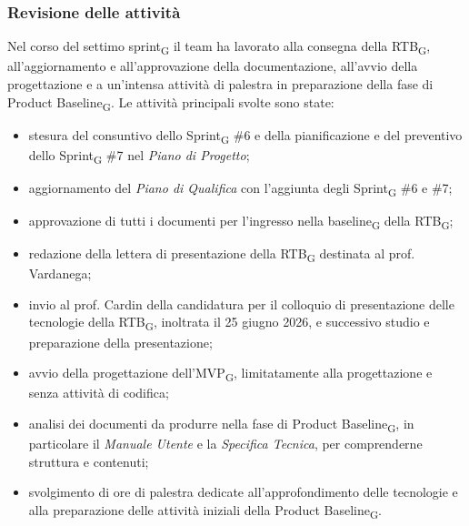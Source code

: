 \documentclass[a4paper, 10pt, colorlinks=true, linkcolor=black, urlcolor=blue, citecolor=blue, hidelinks]{article}
\begin{document}
\subsubsection{Revisione delle attività}
Nel corso del settimo sprint\textsubscript{G} il team ha lavorato alla consegna della RTB\textsubscript{G}, all'aggiornamento e all'approvazione della documentazione, all'avvio della progettazione e a un'intensa attività di palestra in preparazione della fase di Product Baseline\textsubscript{G}. Le attività principali svolte sono state:
\begin{itemize}
    \item stesura del consuntivo dello Sprint\textsubscript{G} \#6 e della pianificazione e del preventivo dello Sprint\textsubscript{G} \#7 nel \textit{Piano di Progetto};
    \item aggiornamento del \textit{Piano di Qualifica} con l'aggiunta degli Sprint\textsubscript{G} \#6 e \#7;
    \item approvazione di tutti i documenti per l'ingresso nella baseline\textsubscript{G} della RTB\textsubscript{G};
    \item redazione della lettera di presentazione della RTB\textsubscript{G} destinata al prof. Vardanega;
    \item invio al prof. Cardin della candidatura per il colloquio di presentazione delle tecnologie della RTB\textsubscript{G}, inoltrata il 25 giugno 2026, e successivo studio e preparazione della presentazione;
    \item avvio della progettazione dell'MVP\textsubscript{G}, limitatamente alla progettazione e senza attività di codifica;
    \item analisi dei documenti da produrre nella fase di Product Baseline\textsubscript{G}, in particolare il \textit{Manuale Utente} e la \textit{Specifica Tecnica}, per comprenderne struttura e contenuti;
    \item svolgimento di ore di palestra dedicate all'approfondimento delle tecnologie e alla preparazione delle attività iniziali della Product Baseline\textsubscript{G}.
\end{itemize}
\end{document}
